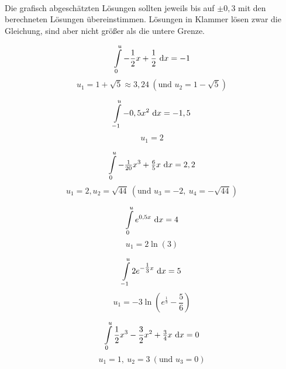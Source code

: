 \begin{Answer}[ref=intGrenzeA1]\\
	Die grafisch abgeschätzten Lösungen sollten jeweils bis auf \(\pm0,3\) mit den berechneten Lösungen übereinstimmen. Lösungen in Klammer lösen zwar die Gleichung, sind aber nicht größer als die untere Grenze.

	\begin{minipage}{\textwidth}
		\begin{minipage}{.5\textwidth}\raggedright
			\[\int\limits_0^u-\frac{1}{2}x+\frac{1}{2} \ \text{d} x=-1\]
			\[u_1=1+\sqrt{5}\approx3,24\ \left(\text{und }u_2=1-\sqrt{5}\right)\]
		\end{minipage}%
		\begin{minipage}{.5\textwidth}
			\[\int\limits_{-1}^u-0,5x^2 \ \text{d} x=-1,5\]
			\[u_1=2\]
		\end{minipage}%

        \vspace{2cm}

		\begin{minipage}{.5\textwidth}\raggedright
			\[\int\limits_0^u-\tfrac{1}{20}x^3+\tfrac{6}{5}x \ \text{d} x=2,2\]
			\[u_1=2, u_2=\sqrt{44}\ \left(\text{und }u_3=-2,\ u_4=-\sqrt{44}\right)\]
		\end{minipage}%
		\begin{minipage}{.5\textwidth}
			\[\int\limits_0^u e^{0,5x} \ \text{d} x=4\]
			\[u_1=2\ln(3)\]
		\end{minipage}

        \vspace{2cm}

		\begin{minipage}{.5\textwidth}\raggedright
			\[\int\limits_{-1}^u 2e^{-\tfrac{1}{3}x} \ \text{d} x=5\]
			\[u_1=-3\ln\left(e^{\tfrac{1}{3}}-\frac{5}{6}\right)\]
		\end{minipage}%
		\begin{minipage}{.5\textwidth}
			\[\int\limits_0^u \frac{1}{2}x^3-\frac{3}{2}x^2+\tfrac{3}{4}x \ \text{d} x=0\]
			\[u_1=1,\ u_2=3\ \left(\text{und }u_3=0\right)\]
		\end{minipage}%
	\end{minipage}
\end{Answer}